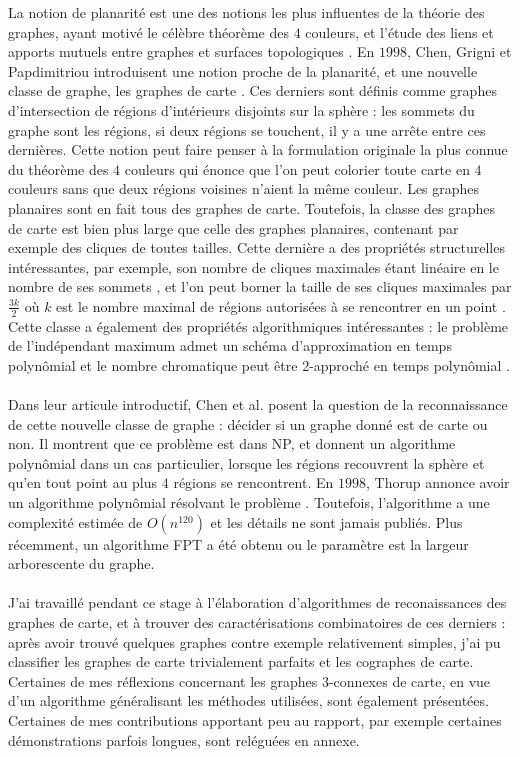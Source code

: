 \documentclass{scrartcl}
\begin{document}
\begin{flushleft}
La notion de planarité est une des notions les plus influentes de la théorie des graphes, ayant motivé le célèbre théorème des $4$ couleurs,
et l'étude des liens et apports mutuels entre graphes et surfaces topologiques \cite{face2conn}. En $1998$, Chen, Grigni et Papdimitriou
introduisent une notion proche de la planarité, et une nouvelle classe de graphe, les graphes de carte \cite{IntroMap}. Ces derniers
sont définis comme graphes d'intersection de régions d'intérieurs disjoints sur la sphère : les sommets du graphe sont les régions,
si deux régions se touchent, il y a une arrête entre ces dernières. Cette notion peut faire penser à la formulation originale la plus
connue du théorème des $4$ couleurs qui énonce que l'on peut colorier toute carte en $4$ couleurs sans que deux régions voisines
n'aient la même couleur. Les graphes planaires sont en fait tous des graphes de carte. Toutefois, la classe des graphes de carte
est bien plus large que celle des graphes planaires, contenant par exemple des cliques de toutes tailles. Cette dernière a des
propriétés structurelles intéressantes, par exemple, son nombre de cliques maximales étant linéaire en le nombre de ses sommets
\cite{IntroMap}, et l'on peut borner la taille de ses cliques maximales par $\frac{3k}{2}$ où $k$ est le nombre maximal de régions
autorisées à se rencontrer en un point \cite{IntroMap}. Cette classe a également des propriétés algorithmiques intéressantes :
le problème de l'indépendant maximum admet un schéma d'approximation en temps polynômial et le nombre chromatique
peut être $2$-approché en temps polynômial \cite{approxMap}.
\\~\\
Dans leur articule introductif, Chen et al. posent la question de la reconnaissance de cette nouvelle classe de graphe : décider si un
graphe donné est de carte ou non. Il montrent que ce problème est dans NP, et donnent un algorithme polynômial dans un cas particulier,
lorsque les régions recouvrent la sphère et qu'en tout point au plus $4$ régions se rencontrent. En $1998$, Thorup annonce avoir un algorithme
polynômial résolvant le problème \cite{Thorup}. Toutefois, l'algorithme a une complexité estimée de $O(n^{120})$ \cite{n120} et les détails ne
sont jamais publiés. Plus récemment, un algorithme FPT a été obtenu \cite{FptMap} ou le paramètre est la largeur arborescente du graphe.
\\~\\
J'ai travaillé pendant ce stage à l'élaboration d'algorithmes de reconaissances des graphes de carte, et à trouver des caractérisations
combinatoires de ces derniers : après avoir trouvé quelques graphes contre exemple relativement simples, j'ai pu classifier les graphes
de carte trivialement parfaits et les cographes de carte. Certaines de mes réflexions concernant les graphes $3$-connexes de carte, en vue
d'un algorithme généralisant les méthodes utilisées, sont également présentées. Certaines de mes contributions apportant peu au rapport,
par exemple certaines démonstrations parfois longues, sont reléguées en annexe.


\end{flushleft}
\end{document}

